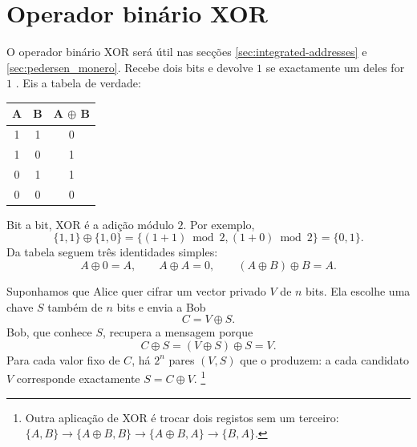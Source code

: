 \section{Operador binário XOR}
\label{sec:XOR_section}

O operador binário XOR será útil nas secções \ref{sec:integrated-addresses} e
\ref{sec:pedersen_monero}.
Recebe dois bits e devolve \(1\) se exactamente um deles for \(1\)
\cite{wolfram-xor}. Eis a tabela de verdade:

\begin{center}
    \begin{tabular}{|c|c|c|}
    \hline
        A & B & A \(\oplus\) B \\
    \hline\hline
        1 & 1 & 0 \\
    \hline
        1 & 0 & 1 \\
    \hline
        0 & 1 & 1 \\
    \hline
        0 & 0 & 0 \\
    \hline
    \end{tabular}
\end{center}

Bit a bit, XOR é a adição módulo \(2\). Por exemplo,
\[
\{1,1\}\oplus\{1,0\}
=\{(1+1)\bmod2,(1+0)\bmod2\}
=\{0,1\}.
\]
Da tabela seguem três identidades simples:
\[
A\oplus0=A,\qquad A\oplus A=0,\qquad
(A\oplus B)\oplus B=A.
\]


Suponhamos que Alice quer cifrar um vector privado \(V\) de \(n\) bits. Ela
escolhe uma chave \(S\) também de \(n\) bits e envia a Bob
\[
C=V\oplus S.
\]
Bob, que conhece \(S\), recupera a mensagem porque
\[
C\oplus S=(V\oplus S)\oplus S=V.
\]
Para cada valor fixo de \(C\), há \(2^n\) pares \((V,S)\) que o produzem: a
cada candidato \(V\) corresponde exactamente \(S=C\oplus V\).
\footnote{Outra aplicação de XOR é trocar dois registos sem um terceiro:
\(\{A,B\}\rightarrow\{A\oplus B,B\}\rightarrow
\{A\oplus B,A\}\rightarrow\{B,A\}\).}

